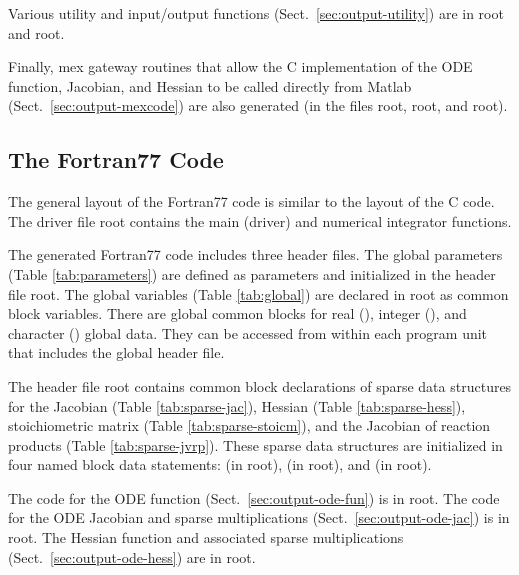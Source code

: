 \documentclass[twoside]{article}
\newcommand{\kpproot}{{\sc root}}
\begin{document}
Various utility and input/output functions (Sect.~\ref{sec:output-utility})
are in \kpproot{} and \kpproot{}.

Finally, mex gateway routines that allow the C implementation of the ODE
function, Jacobian, and Hessian to be called directly from Matlab
(Sect.~\ref{sec:output-mexcode}) are also generated (in the files
\kpproot{}, \kpproot{}, and
\kpproot{}).

\subsection{The Fortran77 Code}
\label{sec:f77}

The general layout of the Fortran77 code is similar to the layout of the C
code. The driver file \kpproot{} contains the main (driver) and
numerical integrator functions.

The generated Fortran77 code includes three header files. The global
parameters (Table \ref{tab:parameters}) are defined as parameters and
initialized in the header file \kpproot{}. The global
variables (Table \ref{tab:global}) are declared in
\kpproot{} as common block variables. There are global
common blocks for real (), integer (), and
character () global data. They can be accessed from
within each program unit that includes the global header file.

The header file \kpproot{} contains common block
declarations of sparse data structures for the Jacobian (Table
\ref{tab:sparse-jac}), Hessian (Table \ref{tab:sparse-hess}),
stoichiometric matrix (Table \ref{tab:sparse-stoicm}), and the Jacobian
of reaction products (Table \ref{tab:sparse-jvrp}). These sparse data
structures are initialized in four named block data statements:
 (in \kpproot{}),
 (in \kpproot{}),
 and  (in
\kpproot{}).

The code for the ODE function (Sect.~\ref{sec:output-ode-fun}) is in
\kpproot{}. The code for the ODE Jacobian and sparse
multiplications (Sect.~\ref{sec:output-ode-jac}) is in
\kpproot{}. The Hessian function and associated sparse
multiplications (Sect.~\ref{sec:output-ode-hess}) are in
\kpproot{}.
\end{document}
